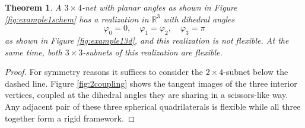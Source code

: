 \documentclass{amsart}
\newtheorem{thm}{Theorem}
\theoremstyle{definition}
\renewcommand{\phi}{\varphi}
\newcommand\RR{\mathbb{R}}
\begin{document}
\begin{thm}
A $3 \times 4$-net with planar angles as shown in Figure \ref{fig:example1schem} has a realization in $\RR^3$ with dihedral angles
\[
\phi_0 = 0, \quad \phi_1 = \phi_2, \quad \phi_3 = \pi
\]
as shown in Figure \ref{fig:example13d}, and this realization is not flexible.
At the same time, both $3 \times 3$-subnets of this realization are flexible.
\end{thm}
\begin{proof}
For symmetry reasons it suffices to consider the $2\times 4$-subnet below the dashed line.
Figure \ref{fig:2coupling} shows the tangent images of the three interior vertices, coupled at the dihedral angles they are sharing in a scissors-like way.
Any adjacent pair of these three spherical quadrilaterals is flexible while all three together form a rigid framework.
\end{proof}
\end{document}

